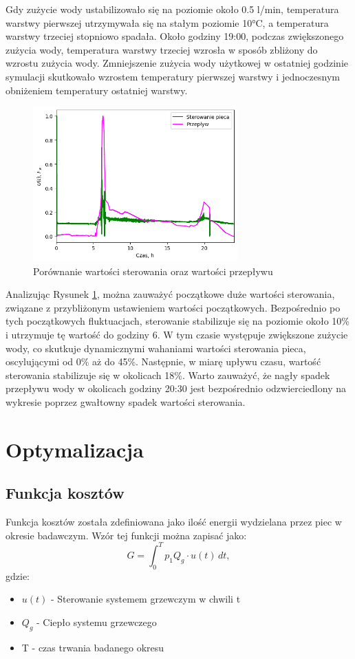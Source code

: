 \documentclass[a4paper,twoside,12pt]{book}
\begin{document}
Gdy zużycie wody ustabilizowało się na poziomie około 0.5 l/min, temperatura warstwy pierwszej utrzymywała się na stałym poziomie 10°C, a temperatura warstwy trzeciej stopniowo spadała. Około godziny 19:00, podczas zwiększonego zużycia wody, temperatura warstwy trzeciej wzrosła w sposób zbliżony do wzrostu zużycia wody. Zmniejszenie zużycia wody użytkowej w ostatniej godzinie symulacji skutkowało wzrostem temperatury pierwszej warstwy i jednoczesnym obniżeniem temperatury ostatniej warstwy.

\newpage
\begin{figure}[!h]
  \centering
  \includegraphics[width=0.7\textwidth]{img/Sterowanie.png}
  \caption{Porównanie wartości sterowania oraz wartości przepływu}
  \label{fig:porównanie_ster_przep}
\end{figure}
Analizując Rysunek \ref{fig:porównanie_ster_przep}, można zauważyć początkowe duże wartości sterowania, związane z przybliżonym ustawieniem wartości początkowych. Bezpośrednio po tych początkowych fluktuacjach, sterowanie stabilizuje się na poziomie około 10\% i utrzymuje tę wartość do godziny 6. W tym czasie występuje zwiększone zużycie wody, co skutkuje dynamicznymi wahaniami wartości sterowania pieca, oscylującymi od 0\% aż do 45\%. Następnie, w miarę upływu czasu, wartość sterowania stabilizuje się w okolicach 18\%. Warto zauważyć, że nagły spadek przepływu wody w okolicach godziny 20:30 jest bezpośrednio odzwierciedlony na wykresie poprzez gwałtowny spadek wartości sterowania.

\section{Optymalizacja}
\subsection*{Funkcja kosztów}
Funkcja kosztów została zdefiniowana jako ilość energii wydzielana przez piec w okresie badawczym. Wzór tej funkcji można zapisać jako:
\begin{equation}
  G = \int_{0}^{T} p_1 Q_g \cdot u(t)  \, dt,
\end{equation}
gdzie:
\begin{itemize}
  \item $u(t)$ - Sterowanie systemem grzewczym w chwili t
  \item $Q_g$ - Ciepło systemu grzewczego
  \item T - czas trwania badanego okresu
\end{itemize}
\end{document}

